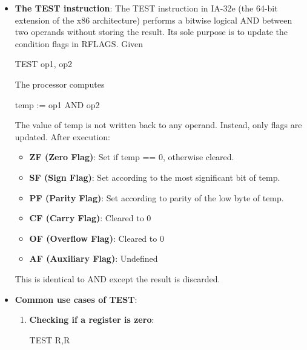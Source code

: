 \documentclass{report}
\begin{document}
\begin{itemize}
        \item \textbf{The TEST instruction}: The TEST instruction in IA-32e (the 64-bit extension of the x86 architecture) performs a bitwise logical AND between two operands without storing the result. Its sole purpose is to update the condition flags in RFLAGS. Given
            \bigbreak \noindent 
            \begin{cppcode}
            TEST  op1, op2
            \end{cppcode}
            \bigbreak \noindent 
            The processor computes
            \bigbreak \noindent 
            \begin{cppcode}
            temp := op1 AND op2
            \end{cppcode}
            \bigbreak \noindent 
            The value of temp is not written back to any operand. Instead, only flags are updated. After execution:
            \begin{itemize}
                \item \textbf{ZF (Zero Flag)}: Set if temp == 0, otherwise cleared.
                \item \textbf{SF (Sign Flag)}: Set according to the most significant bit of temp.
                \item \textbf{PF (Parity Flag)}: Set according to parity of the low byte of temp.
                \item \textbf{CF (Carry Flag)}: Cleared to 0
                \item \textbf{OF (Overflow Flag)}: Cleared to 0
                \item \textbf{AF (Auxiliary Flag)}: Undefined
            \end{itemize}
            This is identical to AND except the result is discarded.
        \item \textbf{Common use cases of TEST}:
            \begin{enumerate}
                \item \textbf{Checking if a register is zero}:
                    \bigbreak \noindent 
                    \begin{cppcode}
                    TEST   R,R


\end{cppcode}
\end{enumerate}
\end{itemize}
\end{document}
